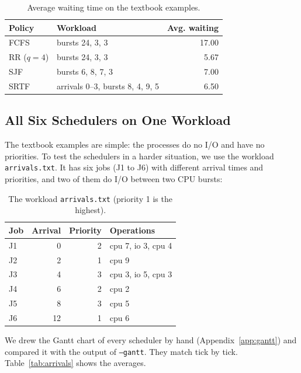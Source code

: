 \begin{table}[H]
\centering
\caption{Average waiting time on the textbook examples.}
\label{tab:cpu_textbook}
\begin{tabular}{llr}
\toprule
Policy & Workload & Avg. waiting \\
\midrule
FCFS & bursts 24, 3, 3 & 17.00 \\
RR ($q=4$) & bursts 24, 3, 3 & 5.67 \\
SJF & bursts 6, 8, 7, 3 & 7.00 \\
SRTF & arrivals 0--3, bursts 8, 4, 9, 5 & 6.50 \\
\bottomrule
\end{tabular}
\end{table}

\subsection{All Six Schedulers on One Workload}
The textbook examples are simple: the processes do no I/O and have no priorities. To test the schedulers in a harder situation, we use the workload \texttt{arrivals.txt}. It has six jobs (J1 to J6) with different arrival times and priorities, and two of them do I/O between two CPU bursts:

\begin{table}[H]
\centering
\caption{The workload \texttt{arrivals.txt} (priority 1 is the highest).}
\label{tab:arrivals_input}
\begin{tabular}{lrrl}
\toprule
Job & Arrival & Priority & Operations \\
\midrule
J1 & 0 & 2 & cpu 7, io 3, cpu 4 \\
J2 & 2 & 1 & cpu 9 \\
J3 & 4 & 3 & cpu 3, io 5, cpu 3 \\
J4 & 6 & 2 & cpu 2 \\
J5 & 8 & 3 & cpu 5 \\
J6 & 12 & 1 & cpu 6 \\
\bottomrule
\end{tabular}
\end{table}

We drew the Gantt chart of every scheduler by hand (Appendix~\ref{app:gantt}) and compared it with the output of \texttt{--gantt}. They match tick by tick. Table~\ref{tab:arrivals} shows the averages.

